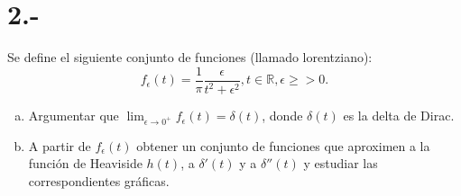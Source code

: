 \documentclass{article}
\begin{document}
\section*{2.-}
Se define el siguiente conjunto de funciones (llamado lorentziano):
\[
f_\epsilon(t)=\frac{1}{\pi}\frac{\epsilon}{t^2+\epsilon^2}, t\in\mathbb{R}, 
\epsilon \ge>0.
\]
\begin{enumerate}[a)]
    \item Argumentar que $\lim_{\epsilon \to 0^+}f_\epsilon(t)=\delta(t)$, 
    donde $\delta(t)$ es la delta de Dirac. 
    \item A partir de $f_\epsilon(t)$ obtener un conjunto de funciones que aproximen a la función de Heaviside $h(t)$, a $\delta'(t)$ y 
    a $\delta''(t)$ y estudiar las correspondientes gráficas. 
\end{enumerate}
\begin{tcolorbox}[breakable]

\end{tcolorbox}
\end{document}
